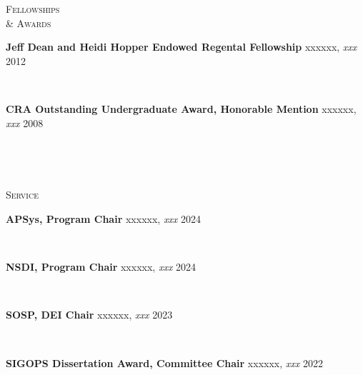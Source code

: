 \documentclass[10pt,times]{report}
\newlength{\sectiongap}
\newlength{\entrygap}
\newlength{\sectioncolwidth}
\newlength{\colgap}
\newlength{\stuffwidth}
\def\ifEqString#1#2{\def\testa{#1}\def\testb{#2}%
  \ifx\testa\testb}
\newenvironment{rtable}{
  \begin{minipage}{\textwidth}
  }{
  \end{minipage}
}
\newenvironment{rentry}[3][xxx]{
  \begin{minipage}[t]{\hsize}
    \textbf{#2}\ifEqString{#1}{xxx}\relax\else, \textit{#1}\fi
    \hspace{\stretch{1}} #3 \\
  }{
    \removelastskip
  \end{minipage}
  \\[\entrygap]  %
}
\newenvironment{rsection}[1]{
  \begin{minipage}[t]{\sectioncolwidth}
    \textsc{#1}
  \end{minipage}
  \hspace{\colgap}
  \begin{minipage}[t]{\stuffwidth}
  }{
    \removelastskip
  \end{minipage}
  \\[\sectiongap]
}
\begin{document}
\begin{rtable}
\begin{rsection}{Fellowships\\\& Awards}
    \begin{rentry}{Jeff Dean and Heidi Hopper Endowed Regental Fellowship}{2012}
       \vspace{-0.5em}
    \end{rentry}
    \begin{rentry}{CRA Outstanding Undergraduate Award, Honorable
      Mention}{2008}
    \vspace{-0.5em}
    \end{rentry}
  \end{rsection}
  \begin{rsection}{Service}
    \begin{rentry}{APSys, Program Chair}{2024}
      \vspace{-0.5em}
    \end{rentry}
    \begin{rentry}{NSDI, Program Chair}{2024}
      \vspace{-0.5em}
    \end{rentry}
    \begin{rentry}{SOSP, DEI Chair}{2023}
      \vspace{-0.5em}
    \end{rentry}
    \begin{rentry}{SIGOPS Dissertation Award, Committee Chair}{2022}
      \vspace{-0.5em}

\end{rentry}
\end{rsection}
\end{rtable}
\end{document}
